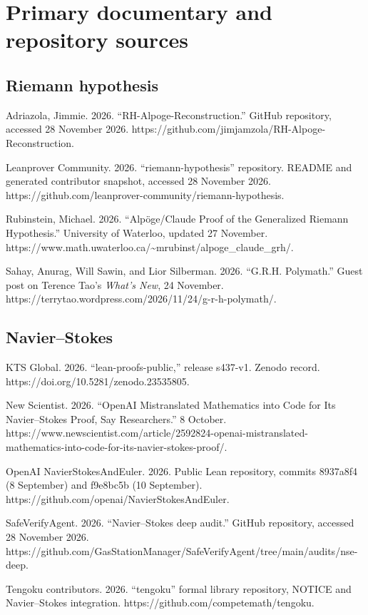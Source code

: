 \documentclass[sn-apa]{sn-jnl}
\begin{document}
\section{Primary documentary and repository sources}

\subsection{Riemann hypothesis}

Adriazola, Jimmie. 2026. “RH-Alpoge-Reconstruction.” GitHub repository, accessed 28 November 2026. https://github.com/jimjamzola/RH-Alpoge-Reconstruction.

Leanprover Community. 2026. “riemann-hypothesis” repository. README and generated contributor snapshot, accessed 28 November 2026. https://github.com/leanprover-community/riemann-hypothesis.

Rubinstein, Michael. 2026. “Alpöge/Claude Proof of the Generalized Riemann Hypothesis.” University of Waterloo, updated 27 November. https://www.math.uwaterloo.ca/\textasciitilde{}mrubinst/alpoge\_claude\_grh/.

Sahay, Anurag, Will Sawin, and Lior Silberman. 2026. “G.R.H. Polymath.” Guest post on Terence Tao’s \emph{What’s New}, 24 November. https://terrytao.wordpress.com/2026/11/24/g-r-h-polymath/.

\subsection{Navier–Stokes}

KTS Global. 2026. “lean-proofs-public,” release s437-v1. Zenodo record. https://doi.org/10.5281/zenodo.23535805.

New Scientist. 2026. “OpenAI Mistranslated Mathematics into Code for Its Navier–Stokes Proof, Say Researchers.” 8 October. https://www.newscientist.com/article/2592824-openai-mistranslated-mathematics-into-code-for-its-navier-stokes-proof/.

OpenAI NavierStokesAndEuler. 2026. Public Lean repository, commits 8937a8f4 (8 September) and f9e8bc5b (10 September). https://github.com/openai/NavierStokesAndEuler.

SafeVerifyAgent. 2026. “Navier–Stokes deep audit.” GitHub repository, accessed 28 November 2026. https://github.com/GasStationManager/SafeVerifyAgent/tree/main/audits/nse-deep.

Tengoku contributors. 2026. “tengoku” formal library repository, NOTICE and Navier–Stokes integration. https://github.com/competemath/tengoku.
\end{document}
